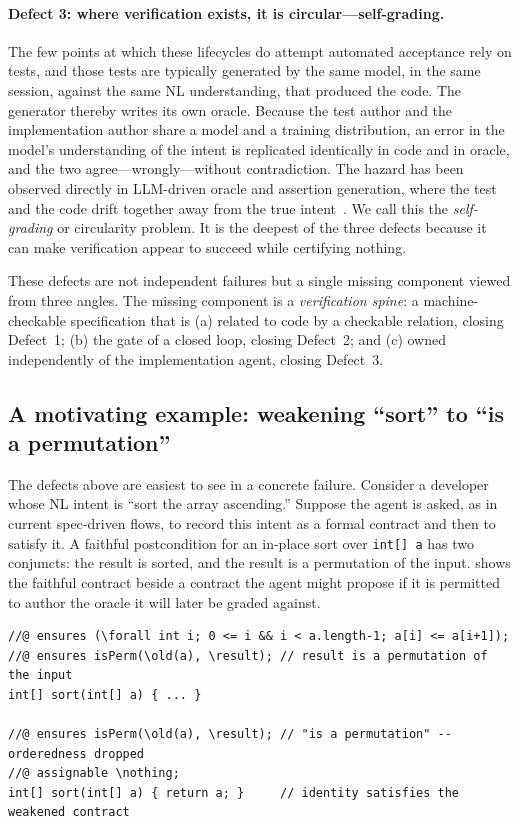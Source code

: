 \paragraph{Defect 3: where verification exists, it is circular---self-grading.}
The few points at which these lifecycles do attempt automated acceptance rely on tests, and those tests are typically generated by the same model, in the same session, against the same NL understanding, that produced the code. The generator thereby writes its own oracle. Because the test author and the implementation author share a model and a training distribution, an error in the model's understanding of the intent is replicated identically in code and in oracle, and the two agree---wrongly---without contradiction. The hazard has been observed directly in LLM-driven oracle and assertion generation, where the test and the code drift together away from the true intent~\cite{liu2026oracle,watson2020atlas}. We call this the \emph{self-grading} or circularity problem. It is the deepest of the three defects because it can make verification appear to succeed while certifying nothing.

These defects are not independent failures but a single missing component viewed from three angles. The missing component is a \emph{verification spine}: a machine-checkable specification that is (a) related to code by a checkable relation, closing Defect~1; (b) the gate of a closed loop, closing Defect~2; and (c) owned independently of the implementation agent, closing Defect~3.

\subsection{A motivating example: weakening ``sort'' to ``is a permutation''}
\label{subsec:motivating-example}

The defects above are easiest to see in a concrete failure. Consider a developer whose NL intent is ``sort the array ascending.'' Suppose the agent is asked, as in current spec-driven flows, to record this intent as a formal contract and then to satisfy it. A faithful postcondition for an in-place sort over \texttt{int[] a} has two conjuncts: the result is sorted, and the result is a permutation of the input.  shows the faithful contract beside a contract the agent might propose if it is permitted to author the oracle it will later be graded against.

\begin{lstlisting}[caption={A faithful sort contract (top) and a silently weakened contract (bottom). The weakened contract drops the orderedness conjunct; the identity function satisfies it.},label={lst:weak-sort}]
//@ ensures (\forall int i; 0 <= i && i < a.length-1; a[i] <= a[i+1]);
//@ ensures isPerm(\old(a), \result); // result is a permutation of the input
int[] sort(int[] a) { ... }

//@ ensures isPerm(\old(a), \result); // "is a permutation" -- orderedness dropped
//@ assignable \nothing;
int[] sort(int[] a) { return a; }     // identity satisfies the weakened contract
\end{lstlisting}

